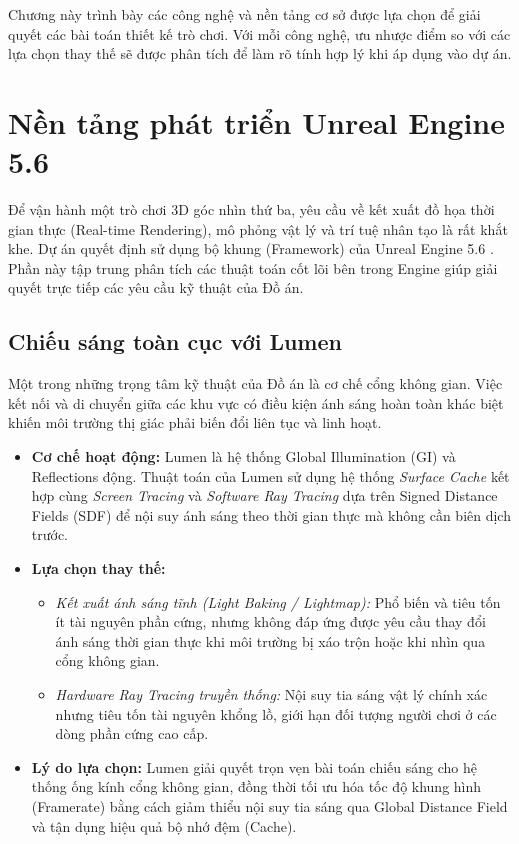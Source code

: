 \documentclass[../DoAn.tex]{subfiles}
\begin{document}
Chương này trình bày các công nghệ và nền tảng cơ sở được lựa chọn để giải quyết các bài toán thiết kế trò chơi. Với mỗi công nghệ, ưu nhược điểm so với các lựa chọn thay thế sẽ được phân tích để làm rõ tính hợp lý khi áp dụng vào dự án.

\section{Nền tảng phát triển Unreal Engine 5.6}
\label{section:3.1}

Để vận hành một trò chơi 3D góc nhìn thứ ba, yêu cầu về kết xuất đồ họa thời gian thực (Real-time Rendering), mô phỏng vật lý và trí tuệ nhân tạo là rất khắt khe. Dự án quyết định sử dụng bộ khung (Framework) của Unreal Engine 5.6 \cite{UE56Doc}. Phần này tập trung phân tích các thuật toán cốt lõi bên trong Engine giúp giải quyết trực tiếp các yêu cầu kỹ thuật của Đồ án.

\subsection{Chiếu sáng toàn cục với Lumen}
Một trong những trọng tâm kỹ thuật của Đồ án là cơ chế cổng không gian. Việc kết nối và di chuyển giữa các khu vực có điều kiện ánh sáng hoàn toàn khác biệt khiến môi trường thị giác phải biến đổi liên tục và linh hoạt.
\begin{itemize}
    \item \textbf{Cơ chế hoạt động:} Lumen là hệ thống Global Illumination (GI) và Reflections động. Thuật toán của Lumen sử dụng hệ thống \textit{Surface Cache} kết hợp cùng \textit{Screen Tracing} và \textit{Software Ray Tracing} dựa trên Signed Distance Fields (SDF) để nội suy ánh sáng theo thời gian thực mà không cần biên dịch trước.
    \item \textbf{Lựa chọn thay thế:} 
    \begin{itemize}
        \item \textit{Kết xuất ánh sáng tĩnh (Light Baking / Lightmap):} Phổ biến và tiêu tốn ít tài nguyên phần cứng, nhưng không đáp ứng được yêu cầu thay đổi ánh sáng thời gian thực khi môi trường bị xáo trộn hoặc khi nhìn qua cổng không gian.
        \item \textit{Hardware Ray Tracing truyền thống:} Nội suy tia sáng vật lý chính xác nhưng tiêu tốn tài nguyên khổng lồ, giới hạn đối tượng người chơi ở các dòng phần cứng cao cấp. 
    \end{itemize}
    \item \textbf{Lý do lựa chọn:} Lumen giải quyết trọn vẹn bài toán chiếu sáng cho hệ thống ống kính cổng không gian, đồng thời tối ưu hóa tốc độ khung hình (Framerate) bằng cách giảm thiểu nội suy tia sáng qua Global Distance Field và tận dụng hiệu quả bộ nhớ đệm (Cache).
\end{itemize}
\end{document}
